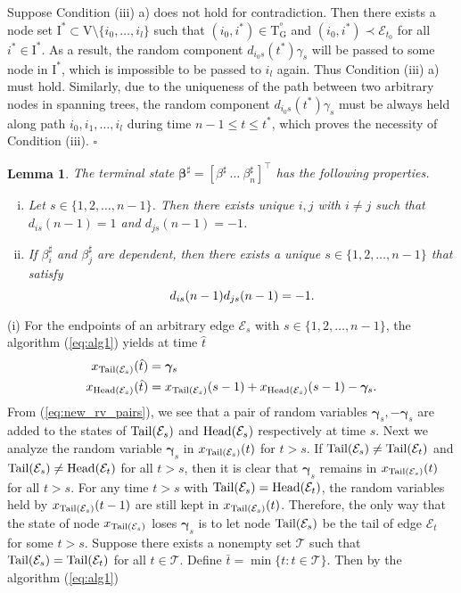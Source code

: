\documentclass[a4paper, 11pt]{article}
\newcommand{\1}{\mathbf{1}}
\newcommand{\asf}{\mathcal{E}}
\newcommand{\Head}{\textnormal{Head}}
\newcommand{\Tail}{\textnormal{Tail}}
\newcommand{\mG}{\mathrm{G}}
\newcommand{\mV}{\mathrm{V}}
\newcommand{\mT}{\mathrm{T}}
\newcommand{\mTG}{\mT^{^o}_{\mG}}
\newcommand{\gammab}{{\bm \gamma}}
\newcommand{\tbeg}{n-1 }
\newcommand{\tend}{t^\ast}
\newcommand{\betab}{\bm{\beta}}
\newtheorem{lemma}{Lemma}
\begin{document}
Suppose Condition (iii) a) does not hold for contradiction. Then there exists a node set $\mathrm{I}^\ast\subset\mV\setminus\{i_0,\dots,i_l\}$ such that $(i_0,i^\ast)\in\mTG$ and $(i_0,i^\ast)\prec\asf_{t_0}$ for all $i^\ast\in\mathrm{I}^\ast$. As a result, the random component $d_{i_0 s}(\tend)\gamma_{s}$ will be passed to some node in $\mathrm{I}^\ast$, which is impossible to be passed to $i_l$ again. Thus Condition (iii) a) must hold. Similarly, due to the uniqueness of the path between two arbitrary nodes in spanning trees, the random component $d_{i_0 s}(\tend)\gamma_{s}$ must be always held along path $i_0,i_1,\dots,i_l$ during time $\tbeg\le t\le\tend$, which proves the necessity of Condition (iii).
\hfill$\square$




\begin{lemma}\label{lem:final_node_states}
	The terminal state $\betab^\sharp=[\beta^\sharp\ \dots\ \beta^\sharp_n]^\top$ has the following properties.
	\begin{enumerate}[(i)]
		\item Let $s\in\{1,2,\dots,n-1 \}$. Then there exists unique $i,j$ with $i\neq j$ such that $ d _{is}(n-1 )=1$ and $ d _{js}(n-1 )=-1$.
		\item If $\beta^\sharp_i$ and $\beta^\sharp_j$ are dependent, then there exists a unique $s\in\{1,2,\dots,n-1 \}$ that satisfy
		\begin{equation}\notag
		d _{is}(n-1 )d _{js}(n-1 )=-1.
		\end{equation}
	\end{enumerate}
\end{lemma}
(i) For the endpoints of an arbitrary edge $\asf_{s}$ with $s\in\{1,2,\dots,n-1 \}$, the algorithm (\ref{eq:alg1}) yields at time $\hat{t}$
\begin{equation}\label{eq:new_rv_pairs}
\begin{aligned}
x_{\Tail(\asf_{s})}(\hat{t}) &= \gammab_{s}\\
x_{\Head(\asf_{s})}(\hat{t}) &= x_{\Tail(\asf_{s})}(s-1) + x_{\Head(\asf_{s})}(s-1) - \gammab_{s}.
\end{aligned}
\end{equation}
From (\ref{eq:new_rv_pairs}), we see that a pair of random variables $\gammab_{s},-\gammab_{s}$ are added to the states of $\Tail(\asf_{s})$ and $\Head(\asf_{s})$ respectively at time $s$. Next we analyze the random variable $\gammab_{s}$ in $x_{\Tail(\asf_{s})}(t)$ for $t>s$. If $\Tail(\asf_{s})\neq\Tail(\asf_t)$ and $\Tail(\asf_{s})\neq\Head(\asf_t)$ for all $t>s$, then it is clear that $\gammab_{s}$ remains in $x_{\Tail(\asf_{s})}(t)$ for all $t>s$. For any time $t>s$ with $\Tail(\asf_{s})=\Head(\asf_t)$, the random variables held by $x_{\Tail(\asf_{s})}(t-1)$ are still kept in $x_{\Tail(\asf_{s})}(t)$. Therefore, the only way that the state of node $x_{\Tail(\asf_{s})}$ loses $\gammab_{s}$ is to let node $\Tail(\asf_{s})$ be the tail of edge $\asf_t$ for some $t>s$. Suppose there exists a nonempty set $\mathcal{T}$ such that $\Tail(\asf_{s})=\Tail(\asf_t)$ for all $t\in\mathcal{T}$. Define $\bar{t}=\min\{t:t\in\mathcal{T}\}$. Then by the algorithm (\ref{eq:alg1})
\end{document}
